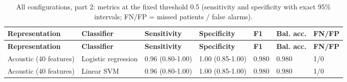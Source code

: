 \documentclass[11pt,a4paper]{article}
\begin{document}
\begin{center}\small\renewcommand{\arraystretch}{1.15}
\begin{longtable}{>{\raggedright\arraybackslash}p{3.08cm}>{\raggedright\arraybackslash}p{1.88cm}>{\raggedright\arraybackslash}p{1.97cm}>{\raggedright\arraybackslash}p{1.97cm}>{\raggedleft\arraybackslash}p{1.55cm}>{\raggedleft\arraybackslash}p{1.55cm}>{\raggedleft\arraybackslash}p{1.55cm}}
\caption{All configurations, part 2: metrics at the fixed threshold 0.5 (sensitivity and specificity with exact 95\% intervals; FN/FP = missed patients / false alarms).}\\
\toprule
\textbf{\hspace{0pt}Representation} & \textbf{\hspace{0pt}Classifier} & \textbf{\hspace{0pt}Sensitivity} & \textbf{\hspace{0pt}Specificity} & \textbf{\hspace{0pt}F1} & \textbf{\hspace{0pt}Bal. acc.} & \textbf{\hspace{0pt}FN/\allowbreak{}FP}\\\midrule\endfirsthead
\toprule
\textbf{\hspace{0pt}Representation} & \textbf{\hspace{0pt}Classifier} & \textbf{\hspace{0pt}Sensitivity} & \textbf{\hspace{0pt}Specificity} & \textbf{\hspace{0pt}F1} & \textbf{\hspace{0pt}Bal. acc.} & \textbf{\hspace{0pt}FN/\allowbreak{}FP}\\\midrule\endhead
\bottomrule\endfoot
\hspace{0pt}Acoustic (40 features) & \hspace{0pt}Logistic regression & \hspace{0pt}0.96 (0.80-1.00) & \hspace{0pt}1.00 (0.85-1.00) & \hspace{0pt}0.980 & \hspace{0pt}0.980 & \hspace{0pt}1/\allowbreak{}0\\
\hspace{0pt}Acoustic (40 features) & \hspace{0pt}Linear SVM & \hspace{0pt}0.96 (0.80-1.00) & \hspace{0pt}1.00 (0.85-1.00) & \hspace{0pt}0.980 & \hspace{0pt}0.980 & \hspace{0pt}1/\allowbreak{}0\\

\end{longtable}
\end{center}
\end{document}
